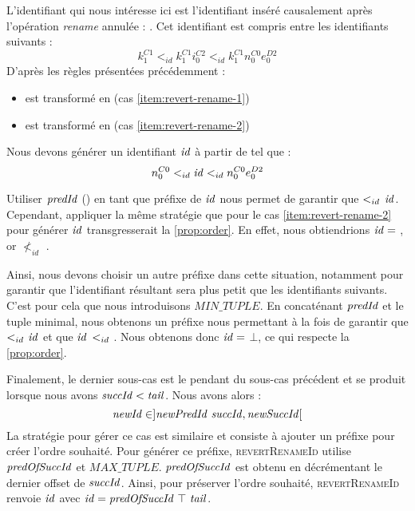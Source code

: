 L'identifiant qui nous intéresse ici est l'identifiant inséré causalement après l'opération \emph{rename} annulée : .
Cet identifiant est compris entre les identifiants suivants :
\[k^{C1}_{1} <_{id} k^{C1}_{1}i^{C2}_{0} <_{id} k^{C1}_{1}n^{C0}_{0}e^{D2}_{0}\]
D'après les règles présentées précédemment :
\begin{itemize}
  \item {} est transformé en  (cas \ref{item:revert-rename-1})
  \item {} est transformé en  (cas \ref{item:revert-rename-2})
\end{itemize}
Nous devons générer un identifiant $\mathit{id}$ à partir de  tel que :
\[n^{C0}_{0} <_{id} \mathit{id} <_{id} n^{C0}_{0}e^{D2}_{0}\]

Utiliser $\mathit{predId}$ () en tant que préfixe de $\mathit{id}$ nous permet de garantir que  $<_{id}$ $\mathit{id}$.
Cependant, appliquer la même stratégie que pour le cas \ref{item:revert-rename-2} pour générer $\mathit{id}$ transgresserait la \autoref{prop:order}.
En effet, nous obtiendrions $\mathit{id} = $ , or  $\nless_{id}$ .

Ainsi, nous devons choisir un autre préfixe dans cette situation, notamment pour garantir que l'identifiant résultant sera plus petit que les identifiants suivants.
C'est pour cela que nous introduisons $MIN\_TUPLE$.
En concaténant $\mathit{predId}$ et le tuple minimal, nous obtenons un préfixe nous permettant à la fois de garantir que  $<_{id}$ $\mathit{id}$ et que $\mathit{id}$ $<_{id}$ .
Nous obtenons donc $\mathit{id} = $ $\bot$, ce qui respecte la \autoref{prop:order}.

Finalement, le dernier sous-cas est le pendant du sous-cas précédent et se produit lorsque nous avons $\mathit{succId} < \mathit{tail}$.
Nous avons alors :
\[\mathit{newId} \in ]\mathit{newPredId~succId}, \mathit{newSuccId}[\]
La stratégie pour gérer ce cas est similaire et consiste à ajouter un préfixe pour créer l'ordre souhaité.
Pour générer ce préfixe, \textsc{revertRenameId} utilise  $\mathit{predOfSuccId}$ et $MAX\_TUPLE$.
$\mathit{predOfSuccId}$ est obtenu en décrémentant le dernier offset de $\mathit{succId}$.
Ainsi, pour préserver l'ordre souhaité, \textsc{revertRenameId} renvoie $\mathit{id}$ avec $\mathit{id} = \mathit{predOfSuccId~\top~tail}$.

